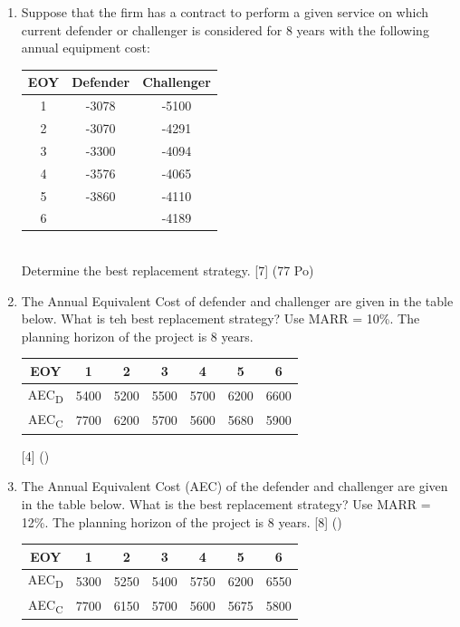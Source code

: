 \documentclass[12pt]{article}
\newcommand{\sub}[1]{\textsubscript{#1}}
\begin{document}
\begin{enumerate}
				\item Suppose that the firm has a contract to perform a given service on which current defender or challenger is considered for 8 years with the following annual equipment cost: \\
				\begin{tabular}{|c|c|c|}
					\hline
					EOY & Defender & Challenger \\ \hline
					1 & -3078 & -5100 \\ \hline
					2 & -3070 & -4291 \\ \hline
					3 & -3300 & -4094 \\ \hline
					4 & -3576 & -4065 \\ \hline
					5 & -3860 & -4110 \\ \hline
					6 & & -4189 \\ \hline
				\end{tabular}\\ 
				Determine the best replacement strategy. \hfill [7] (77 Po)

				\item The Annual Equivalent Cost of defender and challenger are given in the table below. What is teh best replacement strategy? Use MARR = 10\%. The planning horizon of the project is 8 years. \\
				\begin{tabular}{|c|c|c|c|c|c|c|}
					\hline
					EOY & 1 & 2 & 3 & 4 & 5 & 6 \\ \hline
					AEC\sub{D} & 5400 & 5200 & 5500 & 5700 & 6200 & 6600 \\ \hline
					AEC\sub{C} & 7700 & 6200 & 5700 & 5600 & 5680 & 5900 \\ \hline
				\end{tabular} \hfill [4] ()

				\item The Annual Equivalent Cost (AEC) of the defender and challenger are given in the table below. What is the best replacement strategy? Use MARR = 12\%. The planning horizon of the project is 8 years. \hfill [8] ()\\
				\begin{tabular}{|c|c|c|c|c|c|c|}
					\hline
					EOY & 1 & 2 & 3 & 4 & 5 & 6 \\ \hline
					AEC\sub{D} & 5300 & 5250 & 5400 & 5750 & 6200 & 6550 \\ \hline
					AEC\sub{C} & 7700 & 6150 & 5700 & 5600 & 5675 & 5800 \\ \hline
				\end{tabular}
			\end{enumerate}
\end{document}
